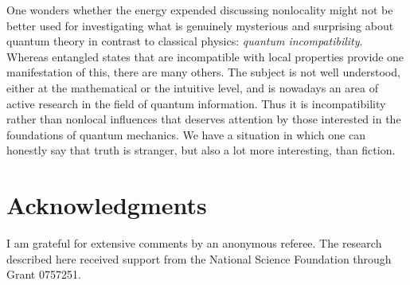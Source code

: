 \documentclass[12pt]{article} %
\begin{document}
One wonders whether the energy expended discussing nonlocality might not be
better used for investigating what is genuinely mysterious and surprising
about quantum theory in contrast to classical physics: \emph{quantum
  incompatibility}.  Whereas entangled states that are incompatible with local
properties provide one manifestation of this, there are many others. The
subject is not well understood, either at the mathematical or the intuitive
level, and is nowadays an area of active research in the field of quantum
information.  Thus it is incompatibility rather than nonlocal influences that
deserves attention by those interested in the foundations of quantum
mechanics.  We have a situation in which one can honestly say that truth is
stranger, but also a lot more interesting, than fiction.

\section*{Acknowledgments}
I am grateful for extensive comments by an anonymous referee. The research
described here received support from the National Science Foundation through
Grant 0757251.


\xb



\end{document}
